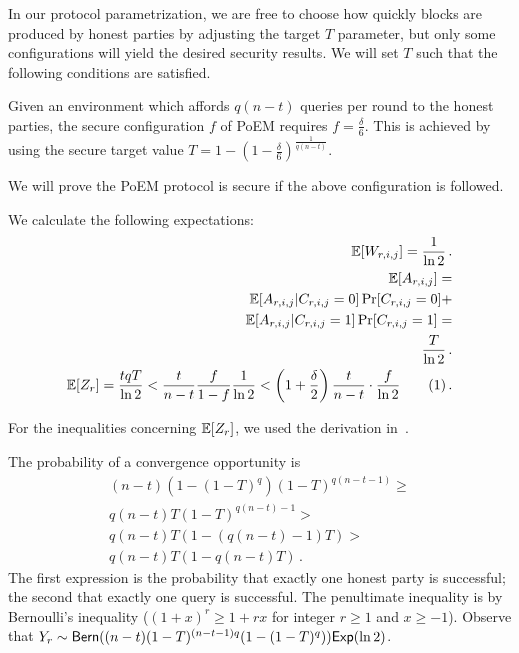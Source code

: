 In our protocol parametrization, we are free to choose how quickly blocks are produced
by honest parties by adjusting the target $T$ parameter, but only some configurations
will yield the desired security results. We will set $T$ such that the following
conditions are satisfied.

\begin{definition}
  Given an environment which affords $q (n - t)$ queries per round to
  the honest parties, the secure configuration $f$ of PoEM requires
  $f = \frac{\delta}{6}$. This is achieved by using the secure target
  value $T = 1 - (1 - \frac{\delta}{6})^{\frac{1}{q(n - t)}}$.
\end{definition}

We will prove the PoEM protocol is secure if the above configuration is
followed.

We calculate the following expectations:
\begin{align*}
  \E[W_{r, i, j}] = \frac{1}{\ln2}\,.\\
  \E[A_{r, i, j}] =\\
  \E[A_{r, i, j} | C_{r, i, j} = 0] \Pr[C_{r, i, j} = 0] +\\
  \E[A_{r, i, j} | C_{r, i, j} = 1] \Pr[C_{r, i, j} = 1] =\\
  \frac{T}{\ln2}\,.\\
  \E[Z_r] = \frac{tqT}{\ln2} < \frac{t}{n - t}\frac{f}{1 - f}\frac{1}{\ln2} < \left(1 + \frac{\delta}{2}\right)\frac{t}{n - t} \cdot \frac{f}{\ln2} \stepcounter{equation}\tag{\theequation}\label{eq.ex-z-bound} \,.
\end{align*}

For the inequalities concerning $\mathop{{}\mathbb{E}}[Z_r]$, we used the derivation in~\cite{backbone}.

The probability of a convergence opportunity is
\begin{align*}
  (n - t) (1 - (1 - T)^q) (1 - T)^{q(n - t - 1)} \geq \\
  q(n - t) T (1 - T)^{q(n - t) - 1} > \\
  q(n - t) T (1 - (q(n - t) - 1)T) > \\
  q(n - t) T (1 - q(n - t)T)\,.
\end{align*}
The first expression is the probability that exactly one honest party is successful;
the second that exactly one query is successful. The penultimate inequality is by
Bernoulli's inequality ($(1 + x)^r \geq 1 + rx$ for integer $r \geq 1$ and $x \geq -1$).
Observe that $Y_r \sim \textsf{Bern}((n - t)(1 - T)^{(n - t - 1)q}(1 - (1 - T)^q)) \textsf{Exp}(\ln 2)$.

